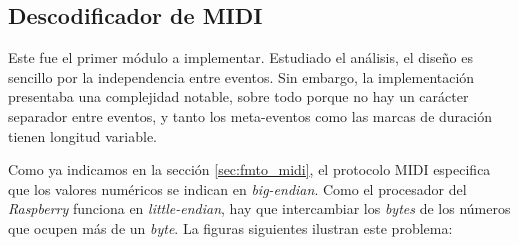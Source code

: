 \subsection{Descodificador de MIDI}

Este fue el primer módulo a implementar. Estudiado el análisis, el diseño es sencillo por la independencia entre eventos. Sin embargo, la implementación presentaba una complejidad notable, sobre todo porque no hay un carácter separador entre eventos, y tanto los meta-eventos como las marcas de duración tienen longitud variable.

Como ya indicamos en la sección \ref{sec:fmto_midi}, el protocolo \acrshort{MIDI} especifica que los valores numéricos se indican en \textit{big-endian}. Como el procesador del \textit{Raspberry} funciona en \textit{little-endian}, hay que intercambiar los \textit{bytes} de los números que ocupen más de un \textit{byte}. La figuras siguientes ilustran este problema:

\smallskip

